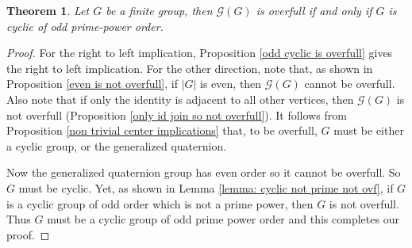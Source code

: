 \documentclass{article}
\newtheorem{theorem}{Theorem}[section]
\newtheorem{question}{Question}
\theoremstyle{definition}
\theoremstyle{indentclaim}
\theoremstyle{named}
\theoremstyle{named}
\begin{document}
\bigskip


\begin{theorem}\label{ovf iff}
    Let $G$ be a finite group, then $\mathscr{G}(G)$ is overfull if and only if $G$ is cyclic of odd prime-power order. 
\end{theorem}

\begin{proof}
    For the right to left implication, Proposition \ref{odd cyclic is overfull} gives the right to left implication. 
    For the other direction, note that, as shown in Proposition \ref{even is not overfull}, if $|G|$ is even, then $\mathscr{G}(G)$ cannot be overfull. Also note that if only the identity is adjacent to all other vertices, then $\mathscr{G}(G)$ is not overfull (Proposition \ref{only id join so not overfull}). It follows from Proposition \ref{non trivial center implications} that, to be overfull, $G$ must be either a cyclic group, or the generalized quaternion. 

    Now the generalized quaternion group has even order so it cannot be overfull. So $G$ must be cyclic. Yet, as shown in Lemma \ref{lemma: cyclic not prime not ovf}, if $G$ is a cyclic group of odd order which is not a prime power, then $G$ is not overfull. Thus $G$ must be a cyclic group of odd prime power order and this completes our proof. 
\end{proof}

\bigskip

\end{document}
